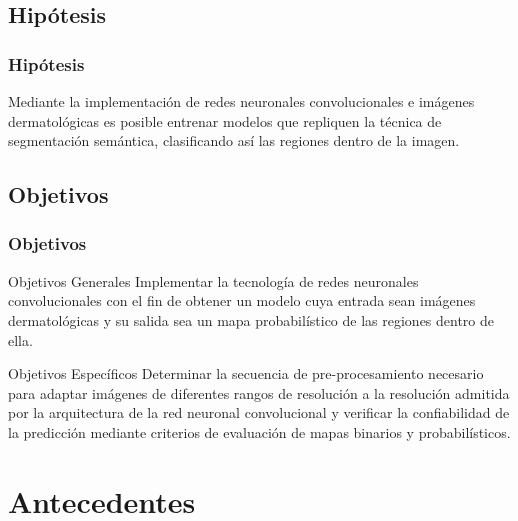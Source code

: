 \documentclass{beamer}
\begin{document}
\subsection{Hipótesis}
\begin{frame}
    \frametitle{Hipótesis}
    Mediante la implementación de redes neuronales convolucionales e imágenes dermatológicas es posible entrenar modelos que repliquen la técnica de segmentación semántica, clasificando así las regiones dentro de la imagen. 
\end{frame}

\subsection{Objetivos}
\begin{frame}
    \frametitle{Objetivos}
    \begin{block}{Objetivos Generales}
        Implementar la tecnología de redes neuronales convolucionales con el fin de obtener un modelo cuya entrada sean imágenes dermatológicas y su salida sea un mapa probabilístico de las regiones dentro de ella.
        
    \end{block}
    \begin{block}{Objetivos Específicos}
        Determinar la secuencia de pre-procesamiento necesario para adaptar imágenes de diferentes rangos de resolución a la resolución admitida por la arquitectura de la red neuronal convolucional y verificar la confiabilidad de la predicción mediante criterios de evaluación de mapas binarios y probabilísticos.
        
    \end{block}
\end{frame}

\section{Antecedentes}

\end{document}
